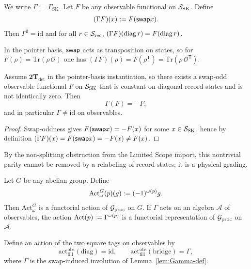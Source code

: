 \begin{lemma}
\label{lem:Gamma-def}
We write $\Gamma:=\Gamma_{\mathrm{SK}}$. Let $F$ be any observable functional on
$\mathcal S_{\mathrm{SK}}$. Define
\[
(\Gamma F)(x):=F(\mathsf{swap} x).
\]
Then $\Gamma^2=\mathrm{id}$ and for all $r\in\mathcal S_{\mathrm{rec}}$,
$(\Gamma F)(\operatorname{diag} r)=F(\operatorname{diag} r)$.
\end{lemma}

\begin{remark}
In the pointer basis, $\mathsf{swap}$ acts as transposition on states, so for
$F(\rho)=\mathrm{Tr}(\rho\,\mathcal O)$ one has
$(\Gamma F)(\rho)=F(\rho^{\mathsf T})=\mathrm{Tr}(\rho\,\mathcal O^{\mathsf T})$.
\end{remark}

\begin{lemma}
\label{lem:detector-Gamma-nontrivial}
Assume $\mathbf{2T}_{\mathrm{det}}$ in the pointer-basis instantiation, so there
exists a swap-odd observable functional $F$ on $\mathcal S_{\mathrm{SK}}$ that is constant on
diagonal record states and is not identically zero. Then
\[
\Gamma(F) = -F,
\]
and in particular $\Gamma\neq \mathrm{id}$ on observables.
\end{lemma}

\begin{proof}
Swap-oddness gives $F(\mathsf{swap} x)=-F(x)$ for some $x\in\mathcal S_{\mathrm{SK}}$, hence by
definition $(\Gamma F)(x)=F(\mathsf{swap} x)=-F(x)\neq F(x)$.
\end{proof}

\begin{remark}
By the non-splitting obstruction from the Limited Scope import, this nontrivial
parity cannot be removed by a relabeling of record states; it is a physical
grading.
\end{remark}

\begin{lemma}
\label{lem:omega-action-on-algebra}
Let $G$ be any abelian group. Define
\[
\mathrm{Act}_\omega^G(p)(g):=(-1)^{\omega(p)}g.
\]
Then $\mathrm{Act}_\omega^G$ is a functorial action of $\mathcal G_{\mathrm{proc}}$ on $G$. If
$\Gamma$ acts on an algebra $\mathcal A$ of observables, the action
$\mathrm{Act}(p):=\Gamma^{\omega(p)}$ is a functorial representation of
$\mathcal G_{\mathrm{proc}}$ on $\mathcal A$.
\end{lemma}

\begin{definition}
\label{def:actFill-obs}
Define an action of the two square tags on observables by
\[
\mathrm{act}_{\mathrm{fill}}^{\mathrm{obs}}(\mathrm{diag})=\mathrm{id},\qquad
\mathrm{act}_{\mathrm{fill}}^{\mathrm{obs}}(\mathrm{bridge})=\Gamma,
\]
where $\Gamma$ is the swap-induced involution of Lemma~\ref{lem:Gamma-def}.
\end{definition}

